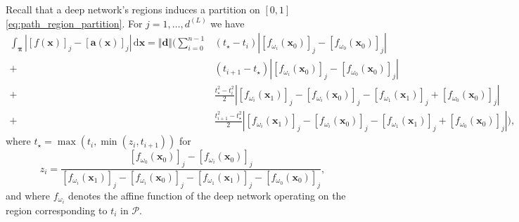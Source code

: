 \begin{proposition}
    Recall that a deep network's regions induces a partition on $[0,1]$ \eqref{eq:path_region_partition}. For $j=1,\dots,d^{(L)}$ we have
    \begin{align*}
        \int_{\boldsymbol{\pi}}\left\vert\left[f(\mathbf{x})\right]_j-\left[\mathbf{a}(\mathbf{x})\right]_j\right\vert\,\mathrm{d}\mathbf{x}=\Vert\mathbf{d}\Vert\Bigg(\sum_{i=0}^{n-1}&\left(t_{\star}-t_i\right)\left\vert\left[f_{\omega_i}\left(\mathbf{x}_0\right)\right]_j-\left[f_{\omega_0}\left(\mathbf{x}_0\right)\right]_j\right\vert\\+&\left(t_{i+1}-t_{\star}\right)\left\vert\left[f_{\omega_i}\left(\mathbf{x}_0\right)\right]_j-\left[f_{\omega_0}\left(\mathbf{x}_0\right)\right]_j\right\vert\\+&\frac{t_{\star}^2-t_i^2}{2}\left\vert\left[f_{\omega_i}\left(\mathbf{x}_1\right)\right]_j-\left[f_{\omega_i}\left(\mathbf{x}_0\right)\right]_j-\left[f_{\omega_1}\left(\mathbf{x}_1\right)\right]_j+\left[f_{\omega_0}\left(\mathbf{x}_0\right)\right]_j\right\vert\\+&\frac{t_{i+1}^2-t_{\star}^2}{2}\left\vert\left[f_{\omega_i}\left(\mathbf{x}_1\right)\right]_j-\left[f_{\omega_i}\left(\mathbf{x}_0\right)\right]_j-\left[f_{\omega_1}\left(\mathbf{x}_1\right)\right]_j+\left[f_{\omega_0}\left(\mathbf{x}_0\right)\right]_j\right\vert\Bigg),
    \end{align*}
    where $t_{\star}=\max\left(t_i,\min\left(z_i,t_{i+1}\right)\right)$ for $$z_i=\frac{\left[f_{\omega_0}\left(\mathbf{x}_0\right)\right]_j-\left[f_{\omega_i}\left(\mathbf{x}_0\right)\right]_j}{\left[f_{\omega_i}\left(\mathbf{x}_1\right)\right]_j-\left[f_{\omega_i}\left(\mathbf{x}_0\right)\right]_j-\left[f_{\omega_1}\left(\mathbf{x}_1\right)\right]_j-\left[f_{\omega_0}\left(\mathbf{x}_0\right)\right]_j},$$and where $f_{\omega_i}$ denotes the affine function of the deep network operating on the region corresponding to $t_i$ in $\mathcal{P}$.
\end{proposition}

